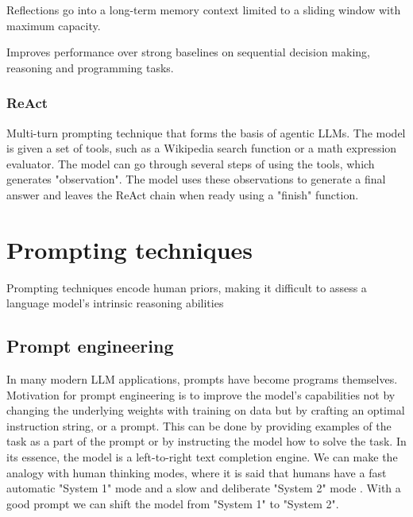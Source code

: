 Reflections go into a long-term memory context limited to a sliding window with maximum capacity. \cite{shinn2023reflexionlanguageagentsverbal}

Improves performance over strong baselines on sequential decision making, reasoning and programming tasks. \cite{shinn2023reflexionlanguageagentsverbal}
\subsubsection{ReAct}
Multi-turn prompting technique that forms the basis of agentic LLMs. The model is given a set of tools, such as a Wikipedia search function or a math expression evaluator.
The model can go through several steps of using the tools, which generates "observation". The model uses these observations to generate a final answer and leaves the ReAct chain when ready using a "finish" function.


\section{Prompting techniques}

Prompting techniques encode human priors, making it difficult to assess a language model's intrinsic reasoning abilities \cite{wang2024chainofthoughtreasoningprompting}

\subsection{Prompt engineering}
In many modern LLM applications, prompts have become programs themselves. \cite{schnabel2024symbolicpromptprogramsearch}
Motivation for prompt engineering is to improve the model's capabilities not by changing the underlying weights with training on data but by crafting an optimal instruction string, or a prompt.
This can be done by providing examples of the task as a part of the prompt or by instructing the model how to solve the task.
In its essence, the model is a left-to-right text completion engine. We can make the analogy with human thinking modes, where it is said that humans
have a fast automatic "System 1" mode and a slow and deliberate "System 2" mode \cite{yao2023treethoughtsdeliberateproblem}. 
With a good prompt we can shift the model from "System 1" to "System 2".
